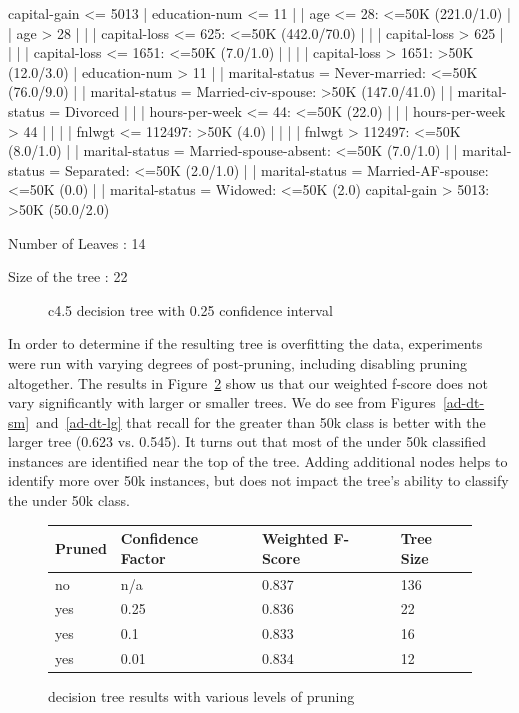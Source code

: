 \documentclass{sig-alternate}
\begin{document}
\small
\begin{verbbox}
capital-gain <= 5013
|   education-num <= 11
|   |   age <= 28:  <=50K (221.0/1.0)
|   |   age > 28
|   |   |   capital-loss <= 625:  <=50K (442.0/70.0)
|   |   |   capital-loss > 625
|   |   |   |   capital-loss <= 1651:  <=50K (7.0/1.0)
|   |   |   |   capital-loss > 1651:  >50K (12.0/3.0)
|   education-num > 11
|   |   marital-status =  Never-married:  <=50K (76.0/9.0)
|   |   marital-status =  Married-civ-spouse:  >50K (147.0/41.0)
|   |   marital-status =  Divorced
|   |   |   hours-per-week <= 44:  <=50K (22.0)
|   |   |   hours-per-week > 44
|   |   |   |   fnlwgt <= 112497:  >50K (4.0)
|   |   |   |   fnlwgt > 112497:  <=50K (8.0/1.0)
|   |   marital-status =  Married-spouse-absent:  <=50K (7.0/1.0)
|   |   marital-status =  Separated:  <=50K (2.0/1.0)
|   |   marital-status =  Married-AF-spouse:  <=50K (0.0)
|   |   marital-status =  Widowed:  <=50K (2.0)
capital-gain > 5013:  >50K (50.0/2.0)

Number of Leaves  :     14

Size of the tree :  22
\end{verbbox}
\normalsize

\begin{figure}[!htbp]
    \centering
    \theverbbox
    \caption{c4.5 decision tree with 0.25 confidence interval \label{ad-dt-c025}}
\end{figure}


In order to determine if the resulting tree is overfitting the data, experiments were run with varying degrees of post-pruning, including disabling pruning altogether. The results in Figure~\ref{ad-dt-pr} show us that our weighted f-score does not vary significantly with larger or smaller trees. We do see from Figures~\ref{ad-dt-sm}~and~\ref{ad-dt-lg} that recall for the greater than 50k class is better with the larger tree (0.623 vs. 0.545). It turns out that most of the under 50k classified instances are identified near the top of the tree. Adding additional nodes helps to identify more over 50k instances, but does not impact the tree's ability to classify the under 50k class.



\begin{figure}[!htbp]
    \centering
    \small
    \begin{tabular}{ | l | l | l | l | }
        \hline
        Pruned & Confidence Factor & Weighted F-Score & Tree Size\\ \hline
        no & n/a & 0.837 & 136\\ \hline
        yes & 0.25 & 0.836 & 22\\ \hline
        yes & 0.1 & 0.833 & 16\\ \hline
        yes & 0.01 & 0.834 & 12\\ \hline
    \end{tabular}
    \normalsize
    \caption{decision tree results with various levels of pruning \label{ad-dt-pr}}
\end{figure}
\end{document}
